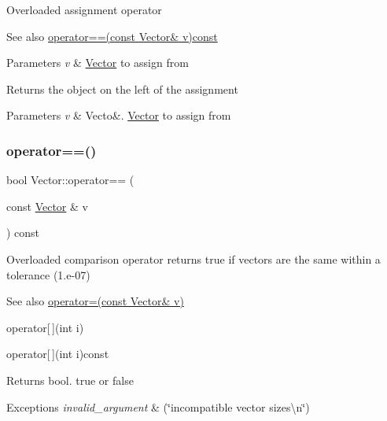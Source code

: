 Overloaded assignment operator \begin{DoxySeeAlso}{See also}
\hyperlink{class_vector_ade5fbd0cd01b034d1907e0c93433320c}{operator==(const Vector\& v)const} 
\end{DoxySeeAlso}

\begin{DoxyParams}{Parameters}
{\em v} & \hyperlink{class_vector}{Vector} to assign from \\
\hline
\end{DoxyParams}
\begin{DoxyReturn}{Returns}
the object on the left of the assignment 
\end{DoxyReturn}

\begin{DoxyParams}{Parameters}
{\em v} & Vecto\&. \hyperlink{class_vector}{Vector} to assign from \\
\hline
\end{DoxyParams}
\mbox{\label{class_vector_ade5fbd0cd01b034d1907e0c93433320c}} 
\subsubsection{\texorpdfstring{operator==()}{operator==()}}
{\footnotesize\ttfamily bool Vector\+::operator== (\begin{DoxyParamCaption}\item[{const \hyperlink{class_vector}{Vector} \&}]{v }\end{DoxyParamCaption}) const}

Overloaded comparison operator returns true if vectors are the same within a tolerance (1.\+e-\/07) \begin{DoxySeeAlso}{See also}
\hyperlink{class_vector_ae48c467a9f65d60e2f7455aba4ca1239}{operator=(const Vector\& v)} 

operator\mbox{[}$\,$\mbox{]}(int i) 

operator\mbox{[}$\,$\mbox{]}(int i)const 
\end{DoxySeeAlso}
\begin{DoxyReturn}{Returns}
bool. true or false 
\end{DoxyReturn}

\begin{DoxyExceptions}{Exceptions}
{\em invalid\+\_\+argument} & (\char`\"{}incompatible vector sizes\textbackslash{}n\char`\"{}) \\
\hline
\end{DoxyExceptions}

